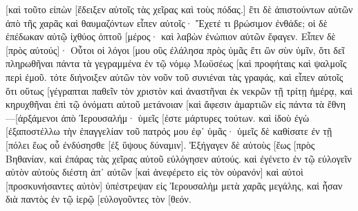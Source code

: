 [καὶ τοῦτο εἰπὼν [ἔδειξεν αὐτοῖς τὰς χεῖρας καὶ τοὺς πόδας.] 
ἔτι δὲ ἀπιστούντων αὐτῶν ἀπὸ τῆς χαρᾶς καὶ θαυμαζόντων εἶπεν αὐτοῖς· Ἔχετέ τι βρώσιμον ἐνθάδε; 
οἱ δὲ ἐπέδωκαν αὐτῷ ἰχθύος ὀπτοῦ [μέρος· 
καὶ λαβὼν ἐνώπιον αὐτῶν ἔφαγεν. 
Εἶπεν δὲ [πρὸς αὐτούς]· Οὗτοι οἱ λόγοι [μου οὓς ἐλάλησα πρὸς ὑμᾶς ἔτι ὢν σὺν ὑμῖν, ὅτι δεῖ πληρωθῆναι πάντα τὰ γεγραμμένα ἐν τῷ νόμῳ Μωϋσέως [καὶ προφήταις καὶ ψαλμοῖς περὶ ἐμοῦ. 
τότε διήνοιξεν αὐτῶν τὸν νοῦν τοῦ συνιέναι τὰς γραφάς, 
καὶ εἶπεν αὐτοῖς ὅτι οὕτως [γέγραπται παθεῖν τὸν χριστὸν καὶ ἀναστῆναι ἐκ νεκρῶν τῇ τρίτῃ ἡμέρᾳ, 
καὶ κηρυχθῆναι ἐπὶ τῷ ὀνόματι αὐτοῦ μετάνοιαν [καὶ ἄφεσιν ἁμαρτιῶν εἰς πάντα τὰ ἔθνη—[ἀρξάμενοι ἀπὸ Ἰερουσαλήμ· 
ὑμεῖς [ἐστε μάρτυρες τούτων. 
καὶ ἰδοὺ ἐγὼ [ἐξαποστέλλω τὴν ἐπαγγελίαν τοῦ πατρός μου ἐφ᾽ ὑμᾶς· ὑμεῖς δὲ καθίσατε ἐν τῇ [πόλει ἕως οὗ ἐνδύσησθε [ἐξ ὕψους δύναμιν]. 
Ἐξήγαγεν δὲ αὐτοὺς [ἕως [πρὸς Βηθανίαν, καὶ ἐπάρας τὰς χεῖρας αὐτοῦ εὐλόγησεν αὐτούς. 
καὶ ἐγένετο ἐν τῷ εὐλογεῖν αὐτὸν αὐτοὺς διέστη ἀπ᾽ αὐτῶν [καὶ ἀνεφέρετο εἰς τὸν οὐρανόν] 
καὶ αὐτοὶ [προσκυνήσαντες αὐτὸν] ὑπέστρεψαν εἰς Ἰερουσαλὴμ μετὰ χαρᾶς μεγάλης, 
καὶ ἦσαν διὰ παντὸς ἐν τῷ ἱερῷ [εὐλογοῦντες τὸν [θεόν. 
